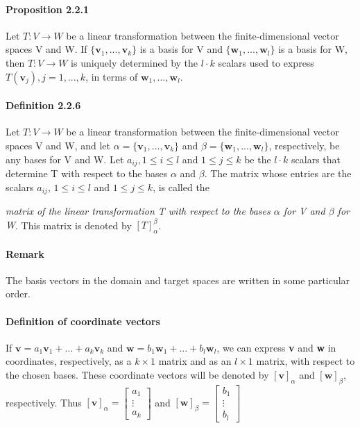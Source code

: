 \documentclass[11pt]{article}
\newcommand{\ti}[1]{\textit{#1}}
\newcommand{\tb}[1]{\textbf{#1}}
\newcommand{\litran}[0]{$T: V \rightarrow W$ }
\begin{document}
	\paragraph{Proposition 2.2.1} Let \litran be a linear transformation between the finite-dimensional vector spaces V and W. If $\{\tb{v}_1,...,\tb{v}_k\}$ is a basis for V and $\{\tb{w}_1,...,\tb{w}_l\}$ is a basis for W, then \litran is uniquely determined by the $l\cdot k$ scalars used to express $T(\tb{v}_j), j = 1,...,k$, in terms of $\tb{w}_1, ..., \tb{w}_l$.
	\paragraph{Definition 2.2.6} Let \litran be a linear transformation between the finite-dimensional vector spaces V and W, and let $\alpha = \{\tb{v}_1,...,\tb{v}_k\}$ and $\beta = \{\tb{w}_1,...,\tb{w}_l\}$, respectively, be any bases for V and W. Let $a_{ij}, 1 \leq i \leq l$ and $1 \leq j\leq k$ be the $l \cdot k$ scalars that determine T with respect to the bases $\alpha$ and $\beta$. The matrix whose entries are the scalars $a_{ij}$, $1 \leq i \leq l$ and $1 \leq j\leq k$, is called the {\ti{matrix of the linear transformation T with respect to the bases $\alpha$ for V and $\beta$ for W}. This matrix is denoted by $[T]^\beta_\alpha$.
	\paragraph{Remark} The basis vectors in the domain and target spaces are written in some particular order.
	\paragraph{Definition of coordinate vectors} If $\tb{v} = a_1\tb{v}_1+...+a_k\tb{v}_k$ and $\tb{w} = b_1\tb{w}_1+...+b_l\tb{w}_l$, we can express \tb{v} and \tb{w} in coordinates, respectively, as a $k \times 1$ matrix and as an $l \times 1$ matrix, with respect to the chosen bases. These coordinate vectors will be denoted by $[\tb{v}]_\alpha$ and $[\tb{w}]_\beta$, respectively. Thus
	$[\tb{v}]_\alpha = \begin{bmatrix} 
a_1 \\
\vdots\\
a_k
\end{bmatrix}$
and
	$[\tb{w}]_\beta = \begin{bmatrix} 
b_1 \\
\vdots\\
b_l
\end{bmatrix}$
}
\end{document}
